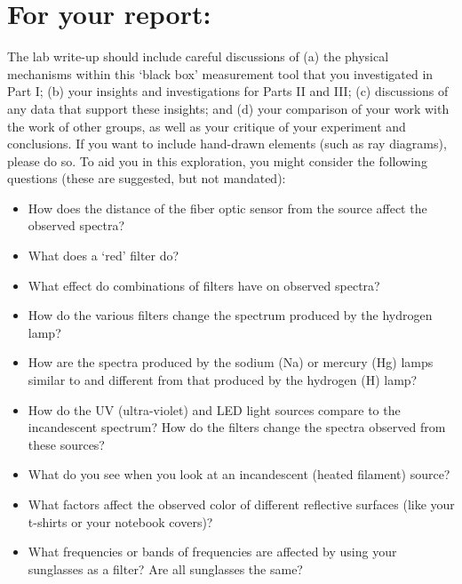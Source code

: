 \section*{For your report:}
The lab write-up should include careful discussions of (a) the physical mechanisms within this ‘black box’ measurement tool that you investigated in Part I; (b) your insights and investigations for Parts II and III; (c) discussions of any data that support these insights; %
and (d) your comparison of your work with the work of other groups, as well as your critique of your experiment and conclusions. 
If you want to include hand-drawn elements (such as ray diagrams), please do so. 
To aid you in this exploration, you might consider the following questions (these are suggested, but not mandated):
\begin{itemize}
\itemsep-0.3em
\item How does the distance of the fiber optic sensor from the source affect the observed spectra?
\item What does a `red' filter do?
\item What effect do combinations of filters have on observed spectra?
\item How do the various filters change the spectrum produced by the hydrogen lamp?
\item How are the spectra produced by the sodium (Na) or mercury (Hg) lamps similar to and different from that produced by the hydrogen (H) lamp?
\item How do the UV (ultra-violet) and LED light sources compare %
to the incandescent spectrum? How do the filters change the spectra observed from these sources?
\item What do you see when you look at an incandescent (heated filament) source? %
\item What factors affect the observed color of different reflective surfaces (like your t-shirts or your notebook covers)?
\item What frequencies or bands of frequencies are affected by using your sunglasses as a filter? Are all sunglasses the same?
\end{itemize}
